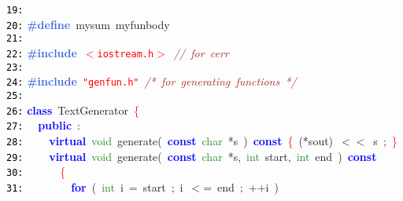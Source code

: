 \documentclass{article}
\begin{document}
\mbox{}\texttt{\textcolor{Black}{19:}}  \\
\mbox{}\texttt{\textcolor{Black}{20:}} \textbf{\textcolor{RoyalBlue}{\#define}}\ \label{test.h:20}mysum\ myfunbody\  \\
\mbox{}\texttt{\textcolor{Black}{21:}}  \\
\mbox{}\texttt{\textcolor{Black}{22:}} \textbf{\textcolor{RoyalBlue}{\#include}}\ \texttt{\textcolor{Red}{$<$iostream.h$>$}}\ \textit{\textcolor{Brown}{//\ for\ cerr}} \\
\mbox{}\texttt{\textcolor{Black}{23:}}  \\
\mbox{}\texttt{\textcolor{Black}{24:}} \textbf{\textcolor{RoyalBlue}{\#include}}\ \texttt{\textcolor{Red}{"{}genfun.h"{}}}\ \textit{\textcolor{Brown}{/*\ for\ generating\ functions\ */}} \\
\mbox{}\texttt{\textcolor{Black}{25:}}  \\
\mbox{}\texttt{\textcolor{Black}{26:}} \textbf{\textcolor{Blue}{class}}\ \label{test.h:26}TextGenerator\ \textcolor{Red}{\{} \\
\mbox{}\texttt{\textcolor{Black}{27:}} \ \ \textbf{\textcolor{Blue}{public}}\ \textcolor{BrickRed}{:} \\
\mbox{}\texttt{\textcolor{Black}{28:}} \ \ \ \ \textbf{\textcolor{Blue}{virtual}}\ \textcolor{ForestGreen}{void}\ \label{test.h:28}generate\textcolor{BrickRed}{(}\ \textbf{\textcolor{Blue}{const}}\ \textcolor{ForestGreen}{char}\ \textcolor{BrickRed}{*}s\ \textcolor{BrickRed}{)}\ \textbf{\textcolor{Blue}{const}}\ \textcolor{Red}{\{}\ \textcolor{BrickRed}{(*}sout\textcolor{BrickRed}{)}\ \textcolor{BrickRed}{$<$$<$}\ s\ \textcolor{BrickRed}{;}\ \textcolor{Red}{\}} \\
\mbox{}\texttt{\textcolor{Black}{29:}} \ \ \ \ \textbf{\textcolor{Blue}{virtual}}\ \textcolor{ForestGreen}{void}\ \label{test.h:29}generate\textcolor{BrickRed}{(}\ \textbf{\textcolor{Blue}{const}}\ \textcolor{ForestGreen}{char}\ \textcolor{BrickRed}{*}s\textcolor{BrickRed}{,}\ \textcolor{ForestGreen}{int}\ start\textcolor{BrickRed}{,}\ \textcolor{ForestGreen}{int}\ end\ \textcolor{BrickRed}{)}\ \textbf{\textcolor{Blue}{const}}\  \\
\mbox{}\texttt{\textcolor{Black}{30:}} \ \ \ \ \ \ \textcolor{Red}{\{} \\
\mbox{}\texttt{\textcolor{Black}{31:}} \ \ \ \ \ \ \ \ \textbf{\textcolor{Blue}{for}}\ \textcolor{BrickRed}{(}\ \textcolor{ForestGreen}{int}\ i\ \textcolor{BrickRed}{=}\ start\ \textcolor{BrickRed}{;}\ i\ \textcolor{BrickRed}{$<$=}\ end\ \textcolor{BrickRed}{;}\ \textcolor{BrickRed}{++}i\ \textcolor{BrickRed}{)} \\
\end{document}
